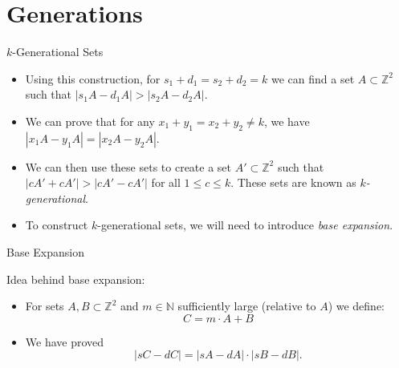 \documentclass[11pt]{beamer}
\newcommand{\Z}{\mathbb{Z}}
\newcommand{\N}{\mathbb{N}}
\newcommand{\Bigskip}{\bigskip
\medskip}
\begin{document}
\section{Generations} %

\begin{frame}{$k$-Generational Sets}

\begin{itemize}

\item Using this construction, for $s_1+d_1=s_2+d_2=k$ we can find a set $A \subset \Z^2$ such that $|s_1A-d_1A|>|s_2A-d_2A|$.

\pause
\Bigskip

\item We can prove that for any $x_1+y_1=x_2+y_2 \neq k$, we have $|x_1A-y_1A|=|x_2A-y_2A|$.

\pause
\Bigskip

\item We can then use these sets to create a set $A'\subset \Z^2$ such that $|cA'+cA'|>|cA'-cA'|$ for all $1\leq c \leq k.$ These sets are known as \emph{$k$-generational}.

\pause
\Bigskip

\item To construct $k$-generational sets, we will need to introduce \emph{base expansion}.

\end{itemize}

\end{frame}


\begin{frame}{Base Expansion}

Idea behind base expansion:

\pause
\Bigskip

\begin{itemize}
\item
For sets $A,B \subset \Z^2$ and $m\in \N$ sufficiently large (relative to $A$) we define:
$$C=m\cdot A+B$$
\pause

\item We have proved
$$\left|sC - dC\right|=\left|sA - dA\right|\cdot\left|sB - dB\right|.$$

\end{itemize}

\end{frame}
\end{document}
